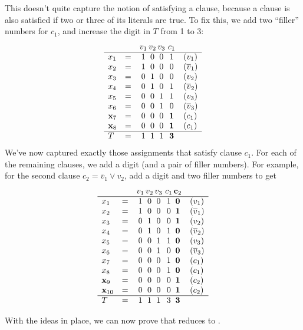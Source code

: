 \documentclass[11pt]{article}
\begin{document}
This doesn't quite capture the notion of satisfying a clause,
because a clause is also satisfied if two or three of its literals are true.
To fix this, we add two ``filler'' numbers for $c_1$, 
and increase the digit in $T$ from 1 to 3:
\[\begin{array}{llc@{\,}c@{\,}c@{~}cl}
&& v_1 & v_2 & v_3 & c_1 \\\hline
  x_1 &=& 1& 0& 0 & 1  & ( v_1)\\
  x_2 &=& 1& 0& 0 & 0  & (\overline v_1)\\
  x_3 &=& 0& 1& 0 & 0  & (v_2)\\
  x_4 &=& 0& 1& 0 & 1  & (\overline v_2)\\
  x_5 &=& 0& 0& 1 & 1  & (v_3)\\
  x_6 &=& 0& 0& 1 & 0 & (\overline v_3)\\
  \mathbf x_7 &=& 0& 0&0&\mathbf 1 & (c_1) \\
  \mathbf x_8 &=& 0& 0&0&\mathbf 1 & (c_1) \\
  \hline
  T & = & 1& 1& 1 & \mathbf 3
\end{array}\]
We've now captured exactly those assignments 
that satisfy clause $c_1$.
For each of the remaining clauses, 
we add a digit (and a pair of filler numbers).
For example, for the second clause $c_2 = \overline v_1 \vee v_2$,
add a digit and two filler numbers to get
\[\begin{array}{llc@{\,}c@{\,}c@{~}c@{\,}cl}
&& v_1 & v_2 & v_3 & c_1 &\mathbf c_2 \\\hline
  x_1 &=& 1& 0& 0 & 1  & \mathbf 0 & ( v_1)\\
  x_2 &=& 1& 0& 0 & 0  & \mathbf 1 & (\overline v_1)\\
  x_3 &=& 0& 1& 0 & 0  &  \mathbf 1 & (v_2)\\
  x_4 &=& 0& 1& 0 & 1  &  \mathbf 0 & (\overline v_2)\\
  x_5 &=& 0& 0& 1 & 1  & \mathbf 0 &(v_3)\\
  x_6 &=& 0& 0& 1 & 0 &  \mathbf 0 &(\overline v_3)\\
  x_7 &=& 0& 0&0& 1 & \mathbf 0 & (c_1) \\
  x_8 &=& 0& 0&0& 1 & \mathbf 0 & (c_1) \\
\mathbf  x_9 &=& 0& 0&0& 0 & \mathbf 1 & (c_2) \\
\mathbf  x_{10} &=& 0& 0&0& 0 & \mathbf 1 & (c_2) \\
  \hline
  T & = & 1& 1& 1 & 3 & \mathbf 3
\end{array}\]

With the ideas in place,
we can now prove that
 reduces to . 
\end{document}
